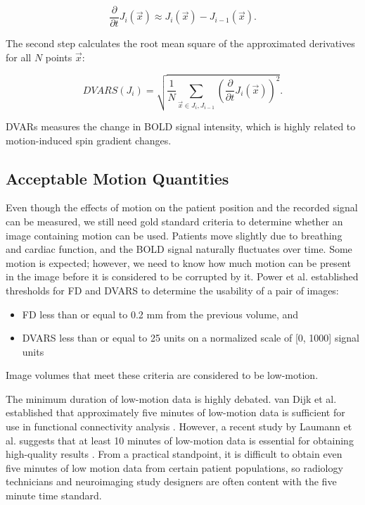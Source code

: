 \begin{equation}
\frac{\partial}{\partial t} J_i(\vec{x}) \approx J_i(\vec{x}) - J_{i-1}(\vec{x}).
\end{equation}

The second step calculates the root mean square of the approximated derivatives for all $N$ points $\vec{x}$:

\begin{equation}
DVARS(J_i) = \sqrt{ \frac{1}{N} \sum_{\vec{x} \in J_i, J_{i-1}} \left( \frac{\partial}{\partial t} J_i(\vec{x}) \right)^2 }.
\end{equation}

DVARs measures the change in BOLD signal intensity, which is highly related to motion-induced spin gradient changes. 

\subsection{Acceptable Motion Quantities}

Even though the effects of motion on the patient position and the recorded signal can be measured, we still need gold standard criteria to determine whether an image containing motion can be used. Patients move slightly due to breathing and cardiac function, and the BOLD signal naturally fluctuates over time. Some motion is expected; however, we need to know how much motion can be present in the image before it is considered to be corrupted by it. Power et al. established thresholds for FD and DVARS to determine the usability of a pair of images:
\begin{itemize}
\item FD less than or equal to 0.2 mm from the previous volume, and
\item DVARS less than or equal to 25 units on a normalized scale of [0, 1000] signal units \cite{Power2014}
\end{itemize}

\noindent Image volumes that meet these criteria are considered to be low-motion.

The minimum duration of low-motion data is highly debated. van Dijk et al. established that approximately five minutes of low-motion data is sufficient for use in functional connectivity analysis \cite{VanDijk2012}. However, a recent study by Laumann et al. suggests that at least 10 minutes of low-motion data is essential for obtaining high-quality results \cite{Laumann2015}. From a practical standpoint, it is difficult to obtain even five minutes of low motion data from certain patient populations, so radiology technicians and neuroimaging study designers are often content with the five minute time standard. 

